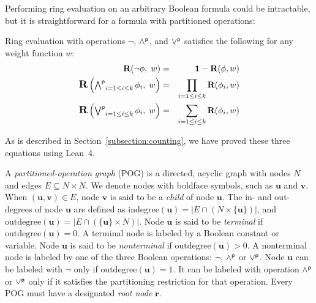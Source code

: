 \documentclass[letterpaper,USenglish,cleveref, autoref, thm-restate]{lipics-v2021}
\newcommand{\pand}{\mathbin{\land^{\sf p}}}
\newcommand{\por}{\mathbin{\lor^{\sf p}}}
\DeclareMathOperator*{\Pand}{\bigwedge^{\sf p}}
\DeclareMathOperator*{\Por}{\bigvee^{\sf p}}
\newcommand{\boolnot}{\neg}
\newcommand{\rep}{\textbf{R}}
\newcommand{\mulident}{\textbf{1}}
\newcommand{\indegree}{\textrm{indegree}}
\newcommand{\outdegree}{\textrm{outdegree}}
\newcommand{\makenode}[1]{\mathbf{#1}}
\newcommand{\nodeu}{\makenode{u}}
\newcommand{\nodev}{\makenode{v}}
\newcommand{\noder}{\makenode{r}}
\newcommand{\lean}{Lean~4}
\begin{document}
Performing ring evaluation on an arbitrary Boolean formula could be intractable, but it is straightforward for a formula with partitioned operations:
\begin{proposition}
\label{prop:ring:eval}
Ring evaluation with operations $\boolnot$, $\pand$, and $\por$ satisfies the following for any weight function $w$:
\begin{eqnarray}
\textstyle
\rep(\boolnot \phi,\; w) &=& \mulident - \rep(\phi, w) \label{eqn:ring:negation} \\
\textstyle
\scalebox{1.2}{\rep}\left(\Pand_{i=1 \leq i \leq k} \phi_i,\; w \right) &=& \prod_{i=1 \leq i \leq k} \rep(\phi_i, w) \label{eqn:ring:product} \\
\textstyle
\scalebox{1.2}{\rep}\left(\Por_{i=1 \leq i \leq k} \phi_i,\; w\right) &=& \sum_{i=1 \leq i \leq k} \rep(\phi_i, w) \label{eqn:ring:sum}
\end{eqnarray}
\end{proposition}
As is described in Section~\ref{subsection:counting}, we have proved these three equations using \lean{}.

A {\em partitioned-operation graph} (POG) is a directed, acyclic graph
with nodes $N$ and edges $E \subseteq N \times N$.  We denote nodes with boldface symbols, such as $\nodeu$ and $\nodev$.
When $(\nodeu,\nodev) \in E$,
node $\nodev$ is said to be a {\em child} of node $\nodeu$.
The in- and out-degrees of node $\nodeu$ are defined as $\indegree(\nodeu) = | E \cap (N \times \{\nodeu\}) |$, and
$\outdegree(\nodeu) = | E \cap (\{\nodeu\} \times N) |$.
Node $\nodeu$ is said to be {\em terminal} if $\outdegree(\nodeu) = 0$.  A terminal node is labeled by a Boolean constant or variable.
Node $\nodeu$ is said to be {\em nonterminal} if $\outdegree(\nodeu) > 0$.
A nonterminal node is labeled by one of the three Boolean operations: $\boolnot$, $\pand$ or $\por$.
Node $\nodeu$ can be labeled with $\boolnot$ only if $\outdegree(\nodeu) = 1$.
It can be labeled with operation $\pand$ or $\por$ only if it satisfies the partitioning restriction for that operation.
Every POG must have a designated {\em root node} $\noder$.
\end{document}
